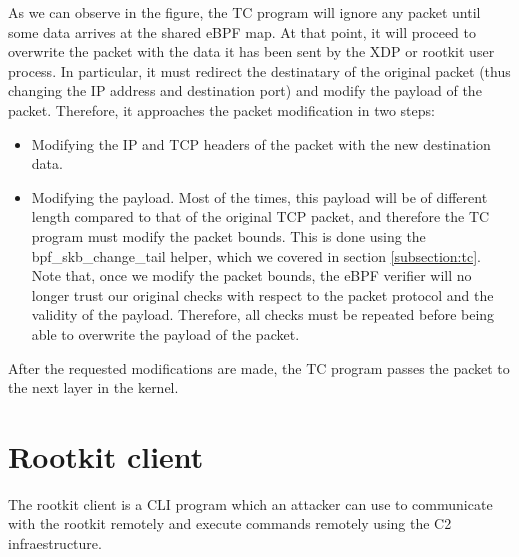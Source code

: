 As we can observe in the figure, the TC program will ignore any packet until some data arrives at the shared eBPF map. At that point, it will proceed to overwrite the packet with the data it has been sent by the XDP or rootkit user process. In particular, it must redirect the destinatary of the original packet (thus changing the IP address and destination port) and modify the payload of the packet. Therefore, it approaches the packet modification in two steps:
\begin{itemize}
\item Modifying the IP and TCP headers of the packet with the new destination data.
\item Modifying the payload. Most of the times, this payload will be of different length compared to that of the original TCP packet, and therefore the TC program must modify the packet bounds. This is done using the bpf\_skb\_change\_tail helper, which we covered in section \ref{subsection:tc}. Note that, once we modify the packet bounds, the eBPF verifier will no longer trust our original checks with respect to the packet protocol and the validity of the payload. Therefore, all checks must be repeated before being able to overwrite the payload of the packet.
\end{itemize}

After the requested modifications are made, the TC program passes the packet to the next layer in the kernel.



\section{Rootkit client}
The rootkit client is a CLI program which an attacker can use to communicate with the rootkit remotely and execute commands remotely using the C2 infraestructure. 











